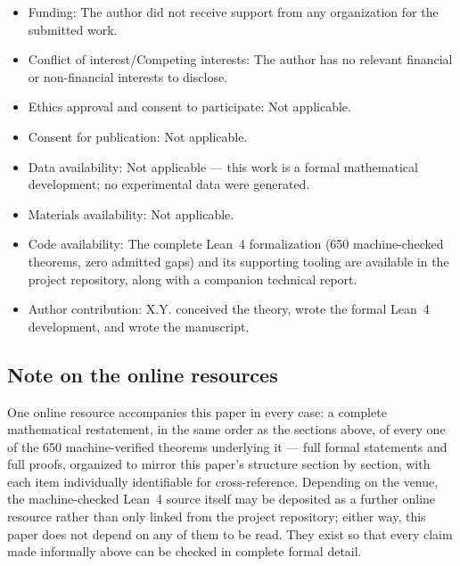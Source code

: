 \documentclass[pdflatex,sn-mathphys-num]{sn-jnl}
\theoremstyle{thmstyleone}
\theoremstyle{thmstylethree}
\theoremstyle{thmstyletwo}
\begin{document}
\begin{itemize}
\item Funding: The author did not receive support from any organization for the submitted work.
\item Conflict of interest/Competing interests: The author has no relevant financial or non-financial interests to disclose.
\item Ethics approval and consent to participate: Not applicable.
\item Consent for publication: Not applicable.
\item Data availability: Not applicable — this work is a formal mathematical development; no experimental data were generated.
\item Materials availability: Not applicable.
\item Code availability: The complete Lean~4 formalization (650 machine-checked theorems, zero admitted gaps) and its supporting tooling are available in the project repository, along with a companion technical report.
\item Author contribution: X.Y. conceived the theory, wrote the formal Lean~4 development, and wrote the manuscript.
\end{itemize}

\begin{appendices}

\section{Note on the online resources}
One online resource accompanies this paper in every case: a complete
mathematical restatement, in the same order as the sections above, of
every one of the 650 machine-verified theorems underlying it — full
formal statements and full proofs, organized to mirror this paper's
structure section by section, with each item individually identifiable
for cross-reference. Depending on the venue, the machine-checked Lean~4
source itself may be deposited as a further online resource rather than
only linked from the project repository; either way, this paper does not
depend on any of them to be read. They exist so that every claim made
informally above can be checked in complete formal detail.

\end{appendices}


\end{document}
